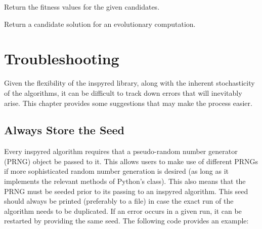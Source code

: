 \documentclass[letterpaper,10pt,english]{sphinxmanual}
\begin{document}
\begin{fulllineitems}
\begin{fulllineitems}
\end{fulllineitems}


\begin{fulllineitems}
\label{reference:inspyred.benchmarks.TSP.evaluator}
Return the fitness values for the given candidates.

\end{fulllineitems}


\begin{fulllineitems}
\label{reference:inspyred.benchmarks.TSP.generator}
Return a candidate solution for an evolutionary computation.

\end{fulllineitems}


\end{fulllineitems}



\chapter{Troubleshooting}
\label{troubleshooting::doc}\label{troubleshooting:troubleshooting}
Given the flexibility of the inspyred library, along with the inherent stochasticity of the algorithms, it can be difficult to track down errors that will inevitably arise. This chapter provides some suggestions that may make the process easier.


\section{Always Store the Seed}
\label{troubleshooting:always-store-the-seed}
Every inspyred algorithm requires that a pseudo-random number generator (PRNG) object be passed to it. This allows users to make use of different PRNGs if more sophisticated random number generation is desired (as long as it implements the relevant methods of Python's  class). This also means that the PRNG must be seeded prior to its passing to an inspyred algorithm. This seed should always be printed (preferably to a file) in case the exact run of the algorithm needs to be duplicated. If an error occurs in a given run, it can be restarted by providing the same seed. The following code provides an example:
\end{document}
